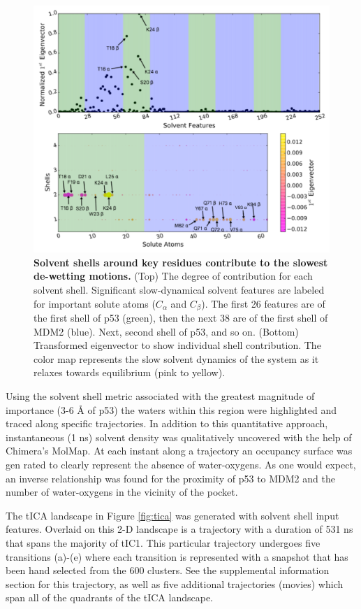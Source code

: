 \begin{figure}[h!]
\centering
\includegraphics[scale=0.5]{Figures/SolvShellFeatures/Solvent_Shell_Feature_Eigen_1.pdf}
\caption{\textbf{Solvent shells around key residues contribute to the slowest de-wetting motions.} (Top) The degree of contribution for each solvent shell. Significant slow-dynamical solvent features are labeled for important solute atoms ($C_{\alpha}$ and $C_{\beta}$). The first 26 features are of the first shell of p53 (green), then the next 38 are of the first shell of MDM2 (blue). Next, second shell of p53, and so on. (Bottom) Transformed eigenvector to show individual shell contribution. The color map represents the slow solvent dynamics of the system as it relaxes towards equilibrium (pink to yellow).}
\label{fig:1st_eigenvector}
\end{figure}


Using the solvent shell metric associated with the greatest magnitude of importance (3-6 Å of p53) the waters within this region were highlighted and traced along specific trajectories. In addition to this quantitative approach, instantaneous (1 ns) solvent density was qualitatively uncovered with the help of Chimera's MolMap. At each instant along a trajectory an occupancy surface was gen rated to clearly represent the absence of water-oxygens. As one would expect, an inverse relationship was found for the proximity of p53 to MDM2 and the number of water-oxygens in the vicinity of the pocket.

The tICA landscape in Figure \ref{fig:tica} was generated with solvent shell input features. Overlaid on this 2-D landscape is a trajectory with a duration of 531 ns that spans the majority of tIC1. This particular trajectory undergoes five transitions (a)-(e) where each transition is represented with a snapshot that has been hand selected from the 600 clusters. See the supplemental information section for this trajectory, as well as five additional trajectories (movies) which span all of the quadrants of the tICA landscape.

